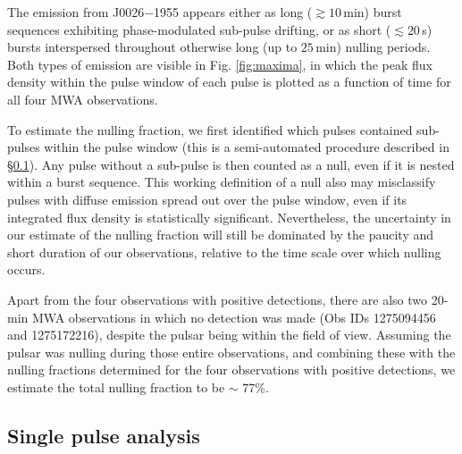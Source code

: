 \documentclass[twocolumn]{aastex631}
\newcommand{\psr}{J0026$-$1955}
\newcommand{\nullfraction}{77\%}
\begin{document}
The emission from \psr{} appears either as long ($\gtrsim 10\,$min) burst sequences exhibiting phase-modulated sub-pulse drifting, or as short ($\lesssim 20\,$s) bursts interspersed throughout otherwise long (up to $25\,$min) nulling periods.
Both types of emission are visible in Fig. \ref{fig:maxima}, in which the peak flux density within the pulse window of each pulse is plotted as a function of time for all four MWA observations.

\begin{figure*}[!t]
    \caption{Peak flux density within the pulse window as a function of time for four MWA detections (MJDs given along the $y$-axis). The peak fluxes were measured after smoothing the time series with a Gaussian filter ($\sim$ 2\,ms wide, the approximate width of a sub-pulse) to suppress the noise contribution and accentuate the contrast between nulling and burst sequences. The two horizontal lines represent two other MWA observations (Obs IDs 1275094456 and 1275172216) for which \psr{} was in the MWA field of view, but not detected.}
    \label{fig:maxima}
\end{figure*}

To estimate the nulling fraction, we first identified which pulses contained sub-pulses within the pulse window (this is a semi-automated procedure described in \S\ref{sec:single_pulse_analysis}).
Any pulse without a sub-pulse is then counted as a null, even if it is nested within a burst sequence.
This working definition of a null also may misclassify pulses with diffuse emission spread out over the pulse window, even if its integrated flux density is statistically significant.
Nevertheless, the uncertainty in our estimate of the nulling fraction will still be dominated by the paucity and short duration of our observations, relative to the time scale over which nulling occurs.

Apart from the four observations with positive detections, there are also two 20-min MWA observations in which no detection was made (Obs IDs 1275094456 and 1275172216), despite the pulsar being within the field of view.
Assuming the pulsar was nulling during those entire observations, and combining these with the nulling fractions determined for the four observations with positive detections, we estimate the total nulling fraction to be $\sim$ \nullfraction{}.

\subsection{Single pulse analysis}
\label{sec:single_pulse_analysis}
\end{document}
